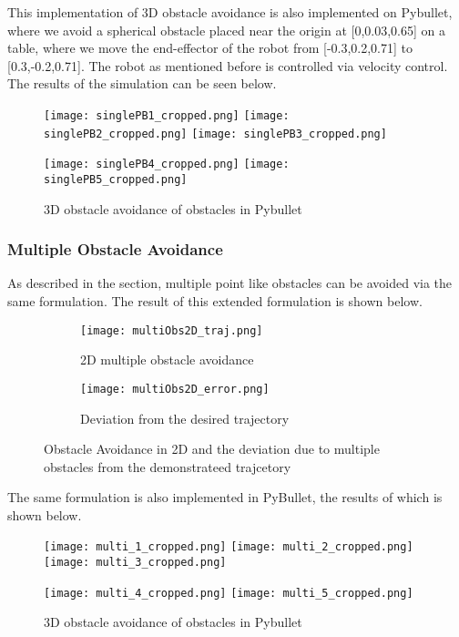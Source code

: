 This implementation of 3D obstacle avoidance is also implemented on Pybullet, where we avoid a spherical obstacle
placed near the origin at [0,0.03,0.65] on a table, where we move the end-effector of the robot from [-0.3,0.2,0.71] to [0.3,-0.2,0.71].
The robot as mentioned before is controlled via velocity control. The results of the simulation can be seen below.
\begin{figure}[!htp]
    \centering
    \texttt{[image: singlePB1\_cropped.png]}\quad
    \texttt{[image: singlePB2\_cropped.png]}\quad
    \texttt{[image: singlePB3\_cropped.png]}

    \medskip

    \texttt{[image: singlePB4\_cropped.png]}\quad
    \texttt{[image: singlePB5\_cropped.png]}

    \caption{3D obstacle avoidance of obstacles in Pybullet}
    \label{fig:pybulletsingleObs}
\end{figure}

\subsubsection{Multiple Obstacle Avoidance}
As described in the section, multiple point like obstacles can be avoided via the same formulation. The result 
of this extended formulation is shown below.

\begin{figure}[!htp]
    \centering
    \begin{subfigure}{0.5\textwidth}
        \texttt{[image: multiObs2D\_traj.png]}
        \caption{2D multiple obstacle avoidance}
    \end{subfigure}%
    \begin{subfigure}{0.5\textwidth}
        \centering
        \texttt{[image: multiObs2D\_error.png]}
        \caption{Deviation from the desired trajectory}
    \end{subfigure}
    \caption{Obstacle Avoidance in 2D and the deviation due to multiple obstacles from the demonstrateed trajcetory}
\end{figure}

The same formulation is also implemented in PyBullet, the results of which is shown below.
\begin{figure}[!htp]
    \centering
    \texttt{[image: multi\_1\_cropped.png]}\quad
    \texttt{[image: multi\_2\_cropped.png]}\quad
    \texttt{[image: multi\_3\_cropped.png]}

    \medskip

    \texttt{[image: multi\_4\_cropped.png]}\quad
    \texttt{[image: multi\_5\_cropped.png]}

    \caption{3D obstacle avoidance of obstacles in Pybullet}
    \label{fig:pybulletsingleObs}
\end{figure}

